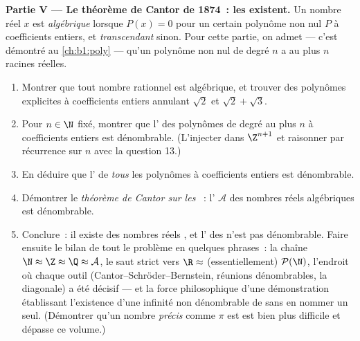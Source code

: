\begin{problem}
\medskip
\noindent\textbf{Partie V --- Le théorème de Cantor de 1874~: les
 existent.} Un nombre réel $x$ est
\emph{algébrique} lorsque $P(x) = 0$ pour un
certain polynôme non nul $P$ à coefficients entiers, et
\emph{transcendant} sinon. Pour cette partie,
on admet --- c'est démontré au \cref{ch:b1:poly} --- qu'un polynôme non
nul de degré $n$ a au plus $n$ racines réelles.
\begin{enumerate}[resume]
  \item Montrer que tout nombre rationnel est algébrique, et trouver des
        polynômes explicites à coefficients entiers annulant $\sqrt 2$
        et $\sqrt 2 + \sqrt 3$.
  \item Pour $n \in \N$ fixé, montrer que l' des polynômes de
        degré au plus $n$ à coefficients entiers est dénombrable.
        (L'injecter dans $\Z^{n+1}$ et raisonner par récurrence sur $n$
        avec la question 13.)
  \item En déduire que l' de \emph{tous} les polynômes à
        coefficients entiers est dénombrable.
  \item Démontrer le \emph{théorème de Cantor sur les }~: l' $\mathcal{A}$ des nombres réels
        algébriques est dénombrable.
  \item Conclure~: il existe des nombres réels , et
        l' des  n'est pas dénombrable.
        Faire ensuite le bilan de tout le problème en quelques phrases~:
        la chaîne $\N \approx \Z \approx \Q \approx \mathcal{A}$, le
        saut strict vers $\R \approx$ (essentiellement)
        $\mathcal{P}(\N)$, l'endroit où chaque outil
        (Cantor--Schröder--Bernstein, réunions dénombrables, la
        diagonale) a été décisif --- et la force philosophique d'une
        démonstration établissant l'existence d'une infinité non
        dénombrable de  sans en nommer un seul.
        (Démontrer qu'un nombre \emph{précis} comme $\pi$ est
         est bien plus difficile et dépasse ce volume.)
\end{enumerate}
\end{problem}
